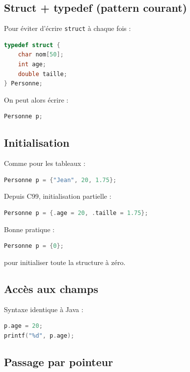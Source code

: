 \subsection{Struct + typedef (pattern courant)}

Pour éviter d’écrire \texttt{struct} à chaque fois :

\begin{lstlisting}[language=C]
typedef struct {
    char nom[50];
    int age;
    double taille;
} Personne;
\end{lstlisting}

On peut alors écrire :

\begin{lstlisting}[language=C]
Personne p;
\end{lstlisting}

\subsection{Initialisation}

Comme pour les tableaux :

\begin{lstlisting}[language=C]
Personne p = {"Jean", 20, 1.75};
\end{lstlisting}

Depuis C99, initialisation partielle :

\begin{lstlisting}[language=C]
Personne p = {.age = 20, .taille = 1.75};
\end{lstlisting}

Bonne pratique :
\begin{lstlisting}[language=C]
Personne p = {0};
\end{lstlisting}
pour initialiser toute la structure à zéro.

\subsection{Accès aux champs}

Syntaxe identique à Java :

\begin{lstlisting}[language=C]
p.age = 20;
printf("%d", p.age);
\end{lstlisting}

\subsection{Passage par pointeur}

